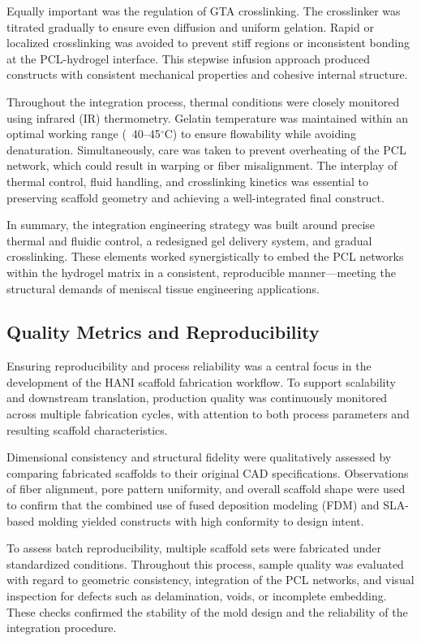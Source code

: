 Equally important was the regulation of GTA crosslinking. The crosslinker was titrated gradually to ensure even diffusion and uniform gelation. Rapid or localized crosslinking was avoided to prevent stiff regions or inconsistent bonding at the PCL-hydrogel interface. This stepwise infusion approach produced constructs with consistent mechanical properties and cohesive internal structure.

Throughout the integration process, thermal conditions were closely monitored using infrared (IR) thermometry. Gelatin temperature was maintained within an optimal working range (~40--45$^\circ$C) to ensure flowability while avoiding denaturation. Simultaneously, care was taken to prevent overheating of the PCL network, which could result in warping or fiber misalignment. The interplay of thermal control, fluid handling, and crosslinking kinetics was essential to preserving scaffold geometry and achieving a well-integrated final construct.

In summary, the integration engineering strategy was built around precise thermal and fluidic control, a redesigned gel delivery system, and gradual crosslinking. These elements worked synergistically to embed the PCL networks within the hydrogel matrix in a consistent, reproducible manner—meeting the structural demands of meniscal tissue engineering applications.

\subsection{Quality Metrics and Reproducibility}

Ensuring reproducibility and process reliability was a central focus in the development of the HANI scaffold fabrication workflow. To support scalability and downstream translation, production quality was continuously monitored across multiple fabrication cycles, with attention to both process parameters and resulting scaffold characteristics.

Dimensional consistency and structural fidelity were qualitatively assessed by comparing fabricated scaffolds to their original CAD specifications. Observations of fiber alignment, pore pattern uniformity, and overall scaffold shape were used to confirm that the combined use of fused deposition modeling (FDM) and SLA-based molding yielded constructs with high conformity to design intent.

To assess batch reproducibility, multiple scaffold sets were fabricated under standardized conditions. Throughout this process, sample quality was evaluated with regard to geometric consistency, integration of the PCL networks, and visual inspection for defects such as delamination, voids, or incomplete embedding. These checks confirmed the stability of the mold design and the reliability of the integration procedure.

